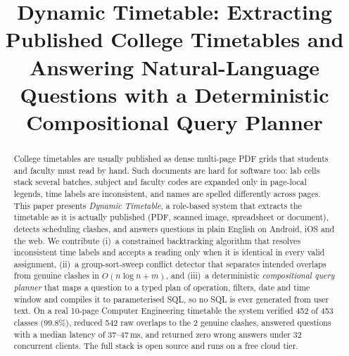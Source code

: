 \documentclass[conference]{IEEEtran}
\begin{document}
\title{Dynamic Timetable: Extracting Published College Timetables and Answering Natural-Language Questions with a Deterministic Compositional Query Planner}

\author{
\and
{}
\and
{}
\and
{}
}

\maketitle

\begin{abstract}
College timetables are usually published as dense multi-page PDF grids that students and faculty
must read by hand. Such documents are hard for software too: lab cells stack several batches, subject
and faculty codes are expanded only in page-local legends, time labels are inconsistent, and names are
spelled differently across pages. This paper presents \emph{Dynamic Timetable}, a role-based system
that extracts the timetable as it is actually published (PDF, scanned image, spreadsheet or document),
detects scheduling clashes, and answers questions in plain English on Android, iOS and the web. We
contribute (i)~a constrained backtracking algorithm that resolves inconsistent time labels and accepts
a reading only when it is identical in every valid assignment, (ii)~a group-sort-sweep conflict detector
that separates intended overlaps from genuine clashes in $O(n\log n + m)$, and (iii)~a deterministic
\emph{compositional query planner} that maps a question to a typed plan of operation, filters, date
and time window and compiles it to parameterised SQL, so no SQL is ever generated from user text. On a
real 10-page Computer Engineering timetable the system verified 452 of 453 classes (99.8\%), reduced
542 raw overlaps to the 2 genuine clashes, answered questions with a median latency of 37--47\,ms, and
returned zero wrong answers under 32 concurrent clients. The full stack is open source and runs on a
free cloud tier.
\end{abstract}
\end{document}
